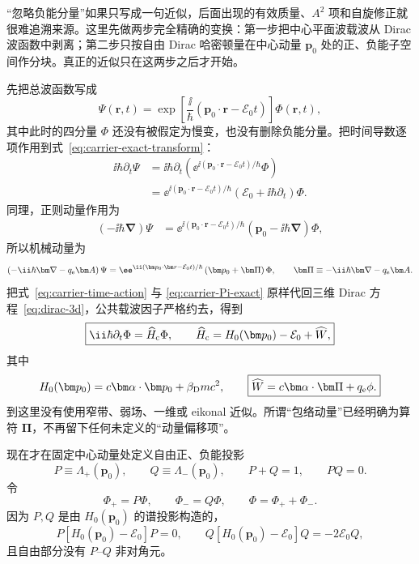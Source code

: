 “忽略负能分量”如果只写成一句近似，后面出现的有效质量、$A^2$ 项和自旋修正就很难追溯来源。这里先做两步完全精确的变换：第一步把中心平面波载波从 Dirac 波函数中剥离；第二步只按自由 Dirac 哈密顿量在中心动量 $\bm p_0$ 处的正、负能子空间作分块。真正的近似只在这两步之后才开始。

先把总波函数写成
\begin{equation}
\Psi(\bm r,t)
=\exp\!\left[\frac{\ii}{\hbar}
(\bm p_0\cdot\bm r-\mathcal E_0 t)\right]\Phi(\bm r,t),
\label{eq:carrier-exact-transform}
\end{equation}
其中此时的四分量 $\Phi$ 还没有被假定为慢变，也没有删除负能分量。把时间导数逐项作用到式~\eqref{eq:carrier-exact-transform}：
\begin{align}
\ii\hbar\partial_t\Psi
&=\ii\hbar\partial_t\left(
\ee^{\ii(\bm p_0\cdot\bm r-\mathcal E_0t)/\hbar}\Phi
\right)\\
&=\ee^{\ii(\bm p_0\cdot\bm r-\mathcal E_0t)/\hbar}
\left(\mathcal E_0+\ii\hbar\partial_t\right)\Phi .
\label{eq:carrier-time-action}
\end{align}
同理，正则动量作用为
\begin{align}
(-\ii\hbar\bm\nabla)\Psi
&=\ee^{\ii(\bm p_0\cdot\bm r-\mathcal E_0t)/\hbar}
\left(\bm p_0-\ii\hbar\bm\nabla\right)\Phi,
\label{eq:carrier-momentum-action-exact}
\end{align}
所以机械动量为
\begin{equation}
\left(-\ii\hbar\bm\nabla-q_{\rm e}\bm A\right)\Psi
=\ee^{\ii(\bm p_0\cdot\bm r-\mathcal E_0t)/\hbar}
\left(\bm p_0+\bm\Pi\right)\Phi,
\qquad
\bm\Pi\equiv-\ii\hbar\bm\nabla-q_{\rm e}\bm A.
\label{eq:carrier-Pi-exact}
\end{equation}
把式~\eqref{eq:carrier-time-action} 与 \eqref{eq:carrier-Pi-exact} 原样代回三维 Dirac 方程~\eqref{eq:dirac-3d}，公共载波因子严格约去，得到
\begin{equation}
\boxed{
\ii\hbar\partial_t\Phi
=\widehat H_{\rm c}\Phi,
\qquad
\widehat H_{\rm c}
=H_0(\bm p_0)-\mathcal E_0
+\widehat W,}
\label{eq:carrier-frame-dirac}
\end{equation}
其中
\begin{equation}
H_0(\bm p_0)=c\bm\alpha\cdot\bm p_0+\beta_{\rm D}mc^2,
\qquad
\boxed{
\widehat W=c\bm\alpha\cdot\bm\Pi+q_{\rm e}\phi.}
\label{eq:carrier-frame-W}
\end{equation}
到这里没有使用窄带、弱场、一维或 eikonal 近似。所谓“包络动量”已经明确为算符 $\bm\Pi$，不再留下任何未定义的“动量偏移项”。

现在才在固定中心动量处定义自由正、负能投影
\begin{equation}
P\equiv\Lambda_+(\bm p_0),
\qquad
Q\equiv\Lambda_-(\bm p_0),
\qquad
P+Q=1,
\qquad
PQ=0.
\label{eq:Feshbach-PQ}
\end{equation}
令
\begin{equation}
\Phi_+=P\Phi,
\qquad
\Phi_-=Q\Phi,
\qquad
\Phi=\Phi_++\Phi_-.
\end{equation}
因为 $P,Q$ 是由 $H_0(\bm p_0)$ 的谱投影构造的，
\begin{equation}
P[H_0(\bm p_0)-\mathcal E_0]P=0,
\qquad
Q[H_0(\bm p_0)-\mathcal E_0]Q=-2\mathcal E_0Q,
\end{equation}
且自由部分没有 $P$--$Q$ 非对角元。

